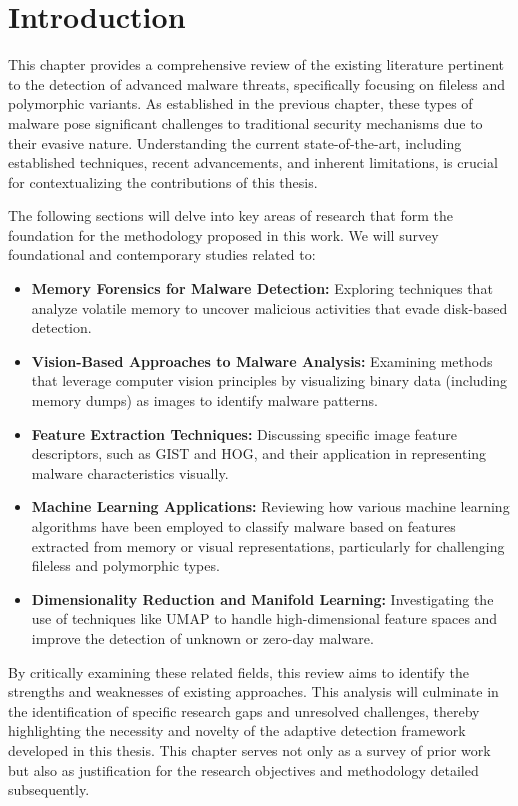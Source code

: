 \section{Introduction}
\label{sec:lit_review_intro}

This chapter provides a comprehensive review of the existing literature pertinent to the detection of advanced malware threats, specifically focusing on fileless and polymorphic variants. As established in the previous chapter, these types of malware pose significant challenges to traditional security mechanisms due to their evasive nature. Understanding the current state-of-the-art, including established techniques, recent advancements, and inherent limitations, is crucial for contextualizing the contributions of this thesis.

The following sections will delve into key areas of research that form the foundation for the methodology proposed in this work. We will survey foundational and contemporary studies related to:
\begin{itemize}
    \item \textbf{Memory Forensics for Malware Detection:} Exploring techniques that analyze volatile memory to uncover malicious activities that evade disk-based detection.
    \item \textbf{Vision-Based Approaches to Malware Analysis:} Examining methods that leverage computer vision principles by visualizing binary data (including memory dumps) as images to identify malware patterns.
    \item \textbf{Feature Extraction Techniques:} Discussing specific image feature descriptors, such as GIST and HOG, and their application in representing malware characteristics visually.
    \item \textbf{Machine Learning Applications:} Reviewing how various machine learning algorithms have been employed to classify malware based on features extracted from memory or visual representations, particularly for challenging fileless and polymorphic types.
    \item \textbf{Dimensionality Reduction and Manifold Learning:} Investigating the use of techniques like UMAP to handle high-dimensional feature spaces and improve the detection of unknown or zero-day malware.
\end{itemize}

By critically examining these related fields, this review aims to identify the strengths and weaknesses of existing approaches. This analysis will culminate in the identification of specific research gaps and unresolved challenges, thereby highlighting the necessity and novelty of the adaptive detection framework developed in this thesis. This chapter serves not only as a survey of prior work but also as justification for the research objectives and methodology detailed subsequently.

